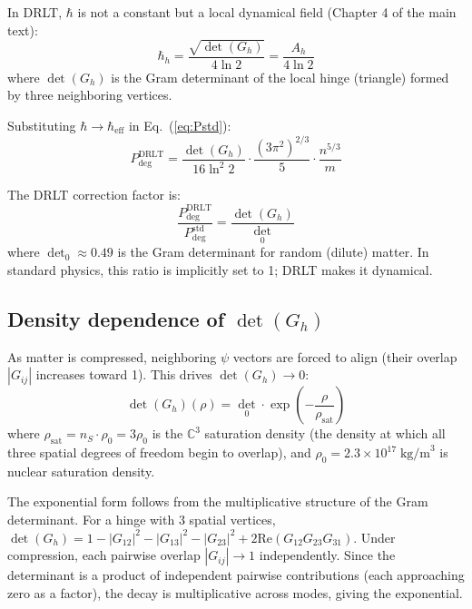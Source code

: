 \documentclass[12pt]{article}
\theoremstyle{definition}
\theoremstyle{remark}
\begin{document}
In DRLT, $\hbar$ is not a constant but a local dynamical field (Chapter 4 of the main text):
\begin{equation}
\hbar_h = \frac{\sqrt{\det(G_h)}}{4\ln 2} = \frac{A_h}{4\ln 2}
\end{equation}
where $\det(G_h)$ is the Gram determinant of the local hinge (triangle) formed by three neighboring vertices.

Substituting $\hbar \to \hbar_\text{eff}$ in Eq.~(\ref{eq:Pstd}):
\begin{equation}
\boxed{P_\text{deg}^\text{DRLT} = \frac{\det(G_h)}{16\ln^2 2} \cdot \frac{(3\pi^2)^{2/3}}{5} \cdot \frac{n^{5/3}}{m}}
\label{eq:Pdrlt}
\end{equation}

The DRLT correction factor is:
\begin{equation}
\frac{P_\text{deg}^\text{DRLT}}{P_\text{deg}^\text{std}} = \frac{\det(G_h)}{\det_0}
\end{equation}
where $\det_0 \approx 0.49$ is the Gram determinant for random (dilute) matter. In standard physics, this ratio is implicitly set to 1; DRLT makes it dynamical.

\subsection{Density dependence of $\det(G_h)$}

As matter is compressed, neighboring $\psi$ vectors are forced to align (their overlap $|G_{ij}|$ increases toward 1). This drives $\det(G_h) \to 0$:
\begin{equation}
\det(G_h)(\rho) = \det_0 \cdot \exp\!\left(-\frac{\rho}{\rho_\text{sat}}\right)
\label{eq:det_rho}
\end{equation}
where $\rho_\text{sat} = n_S \cdot \rho_0 = 3\rho_0$ is the $\mathbb{C}^3$ saturation density (the density at which all three spatial degrees of freedom begin to overlap), and $\rho_0 = 2.3 \times 10^{17}\;\text{kg/m}^3$ is nuclear saturation density.

The exponential form follows from the multiplicative structure of the Gram determinant. For a hinge with 3 spatial vertices, $\det(G_h) = 1 - |G_{12}|^2 - |G_{13}|^2 - |G_{23}|^2 + 2\text{Re}(G_{12}G_{23}G_{31})$. Under compression, each pairwise overlap $|G_{ij}| \to 1$ independently. Since the determinant is a product of independent pairwise contributions (each approaching zero as a factor), the decay is multiplicative across modes, giving the exponential.
\end{document}
